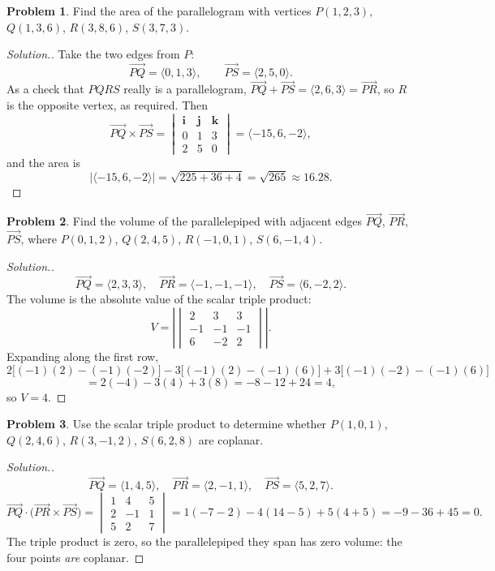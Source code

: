 \documentclass[11pt,a4paper]{article}
\theoremstyle{definition}
\newtheorem{problemx}{Problem}[subsection]
\newenvironment{problem}{\begin{problemx}}{\end{problemx}}
\newenvironment{solution}
  {\renewcommand{\qedsymbol}{}\begin{proof}[\textit{Solution}.]}
  {\end{proof}}
\begin{document}
\begin{problem}
Find the area of the parallelogram with vertices $P(1,2,3)$, $Q(1,3,6)$,
$R(3,8,6)$, $S(3,7,3)$.
\end{problem}
\begin{solution}
Take the two edges from $P$:
$$\overrightarrow{PQ} = \langle 0,1,3\rangle,\qquad
\overrightarrow{PS} = \langle 2,5,0\rangle .$$
As a check that $PQRS$ really is a parallelogram,
$\overrightarrow{PQ} + \overrightarrow{PS} = \langle 2,6,3\rangle
= \overrightarrow{PR}$, so $R$ is the opposite vertex, as required. Then
$$\overrightarrow{PQ}\times\overrightarrow{PS}
= \begin{vmatrix}\textbf{i}&\textbf{j}&\textbf{k}\\0&1&3\\2&5&0\end{vmatrix}
= \langle -15, 6, -2\rangle ,$$
and the area is
$$\left|\langle -15,6,-2\rangle\right| = \sqrt{225+36+4} = \sqrt{265}
\approx 16.28 .$$
\end{solution}

\begin{problem}
Find the volume of the parallelepiped with adjacent edges
$\overrightarrow{PQ}$, $\overrightarrow{PR}$, $\overrightarrow{PS}$, where
$P(0,1,2)$, $Q(2,4,5)$, $R(-1,0,1)$, $S(6,-1,4)$.
\end{problem}
\begin{solution}
$$\overrightarrow{PQ} = \langle 2,3,3\rangle,\quad
\overrightarrow{PR} = \langle -1,-1,-1\rangle,\quad
\overrightarrow{PS} = \langle 6,-2,2\rangle .$$
The volume is the absolute value of the scalar triple product:
$$V = \left|\begin{vmatrix}2&3&3\\-1&-1&-1\\6&-2&2\end{vmatrix}\right| .$$
Expanding along the first row,
$$2\big[(-1)(2)-(-1)(-2)\big] - 3\big[(-1)(2)-(-1)(6)\big]
+ 3\big[(-1)(-2)-(-1)(6)\big]$$
$$= 2(-4) - 3(4) + 3(8) = -8 - 12 + 24 = 4 ,$$
so $V = 4$.
\end{solution}

\begin{problem}
Use the scalar triple product to determine whether $P(1,0,1)$, $Q(2,4,6)$,
$R(3,-1,2)$, $S(6,2,8)$ are coplanar.
\end{problem}
\begin{solution}
$$\overrightarrow{PQ} = \langle 1,4,5\rangle,\quad
\overrightarrow{PR} = \langle 2,-1,1\rangle,\quad
\overrightarrow{PS} = \langle 5,2,7\rangle .$$
$$\overrightarrow{PQ}\cdot\big(\overrightarrow{PR}\times\overrightarrow{PS}\big)
= \begin{vmatrix}1&4&5\\2&-1&1\\5&2&7\end{vmatrix}
= 1(-7-2) - 4(14-5) + 5(4+5) = -9 - 36 + 45 = 0 .$$
The triple product is zero, so the parallelepiped they span has zero volume:
the four points \emph{are} coplanar.
\end{solution}
\end{document}
